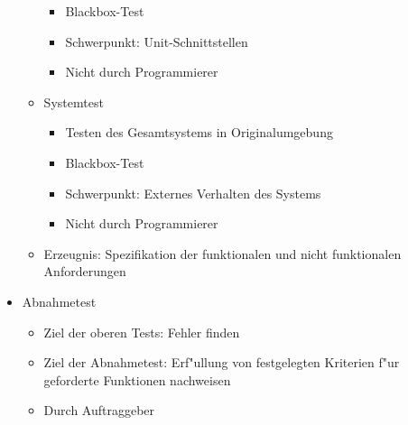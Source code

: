 \begin{itemize}
\begin{itemize}
\begin{itemize}
						\item Blackbox-Test
						\item Schwerpunkt: Unit-Schnittstellen
						\item Nicht durch Programmierer
				\end{itemize}
		\item Systemtest
				\begin{itemize}
						\item Testen des Gesamtsystems in Originalumgebung
						\item Blackbox-Test
						\item Schwerpunkt: Externes Verhalten des Systems
						\item Nicht durch Programmierer
				\end{itemize}
		\item Erzeugnis: Spezifikation der funktionalen und nicht funktionalen Anforderungen 
	\end{itemize}
\item Abnahmetest
	\begin{itemize}
		\item Ziel der oberen Tests: Fehler finden
		\item Ziel der Abnahmetest: Erf"ullung von festgelegten Kriterien f"ur geforderte Funktionen nachweisen 
		\item Durch Auftraggeber
	\end{itemize}
\end{itemize}


